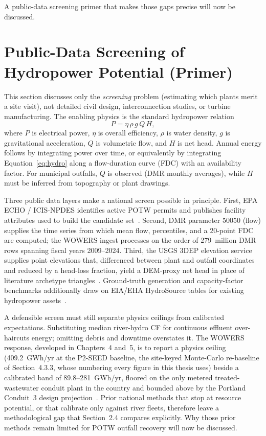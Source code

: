 \documentclass[12pt,letterpaper]{report}
\begin{document}
A public-data screening primer that makes those gaps precise will now be discussed.

\section{Public-Data Screening of Hydropower Potential (Primer)}

This section discusses only the \emph{screening} problem (estimating which plants merit
a site visit), not detailed civil design, interconnection studies, or turbine manufacturing.
The enabling physics is the standard hydropower relation
\begin{equation}
  P = \eta\,\rho\,g\,Q\,H,
  \label{eq:hydro}
\end{equation}
where $P$ is electrical power, $\eta$ is overall efficiency, $\rho$ is water density,
$g$ is gravitational acceleration, $Q$ is volumetric flow, and $H$ is net head. Annual
energy follows by integrating power over time, or equivalently by integrating
Equation~\eqref{eq:hydro} along a flow-duration curve (FDC) with an availability factor.
For municipal outfalls, $Q$ is observed (DMR monthly averages), while $H$ must be inferred
from topography or plant drawings.

Three public data layers make a national screen possible in principle. First, EPA ECHO /
ICIS-NPDES identifies active POTW permits and publishes facility attributes used to build
the candidate set~\cite{epa_echo}. Second, DMR parameter 50050 (flow) supplies the time
series from which mean flow, percentiles, and a 20-point FDC are computed; the WOWERS
ingest processes on the order of 279~million DMR rows spanning fiscal years 2009--2024.
Third, the USGS 3DEP elevation service supplies point elevations that, differenced between
plant and outfall coordinates and reduced by a head-loss fraction, yield a DEM-proxy net
head in place of literature archetype triangles~\cite{usgs_3dep}. Ground-truth generation
and capacity-factor benchmarks additionally draw on EIA/EHA HydroSource tables for existing
hydropower assets~\cite{hydrosource_eha}.

A defensible screen must still separate physics ceilings from calibrated expectations.
Substituting median river-hydro CF for continuous effluent over-haircuts energy; omitting
debris and downtime overstates it. The WOWERS response, developed in Chapters~4 and~5, is
to report a physics ceiling (409.2~GWh/yr at the P2-SEED baseline, the site-keyed
Monte-Carlo re-baseline of Section~4.3.3, whose numbering every figure in this thesis
uses) beside a calibrated band
of 89.8--281~GWh/yr, floored on the only metered treated-wastewater conduit plant in the
country and bounded above by the Portland Conduit~3 design
projection~\cite{hydrosource_eha,lucidpipe}. Prior national
methods that stop at resource potential, or that calibrate only against river fleets,
therefore leave a methodological gap that Section~2.4 compares explicitly. Why those prior
methods remain limited for POTW outfall recovery will now be discussed.
\end{document}
